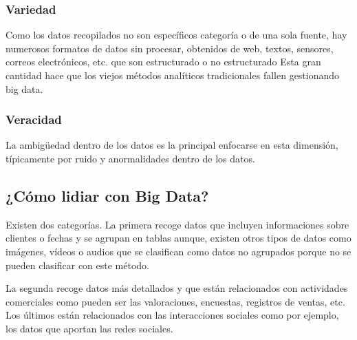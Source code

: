 \subsubsection{Variedad} 
Como los datos recopilados no son específicos
categoría o de una sola fuente, hay
numerosos formatos de datos sin procesar, obtenidos de
web, textos, sensores, correos electrónicos, etc. que son
estructurado o no estructurado Esta gran cantidad
hace que los viejos métodos analíticos tradicionales fallen
gestionando big data.
\subsubsection{Veracidad}
La ambigüedad dentro de los datos es la principal
enfocarse en esta dimensión, típicamente por ruido y
anormalidades dentro de los datos.

\subsection{¿Cómo lidiar con Big Data?}

Existen dos categorías. La primera recoge datos que incluyen informaciones sobre clientes o fechas y se agrupan en tablas aunque, existen otros tipos de datos como imágenes, vídeos o audios que se clasifican como datos no agrupados porque no se pueden clasificar con este método. 


La segunda recoge datos más detallados y que están relacionados con actividades comerciales como pueden ser las valoraciones, encuestas, registros de ventas, etc. Los últimos están relacionados con las interacciones sociales como por ejemplo, los datos que aportan las redes sociales. 

